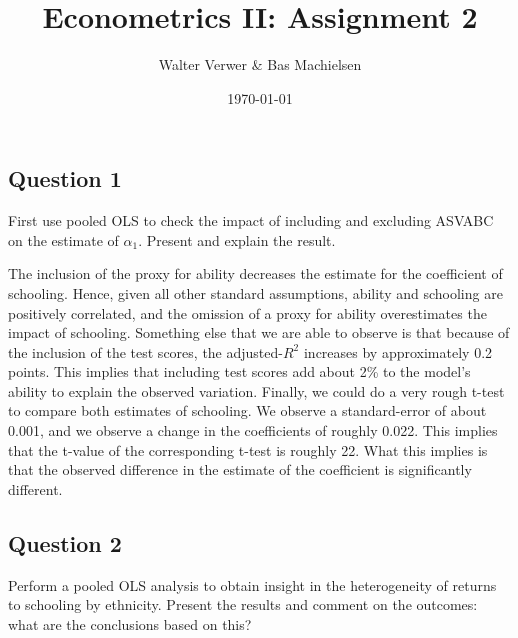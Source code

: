 \documentclass[
]{article}
\title{Econometrics II: Assignment 2}
\author{Walter Verwer \& Bas Machielsen}
\date{\today}
\begin{document}
\maketitle

\hypertarget{question-1}{%
\subsection{Question 1}\label{question-1}}

First use pooled OLS to check the impact of including and excluding
ASVABC on the estimate of \(\alpha_1\). Present and explain the result.



The inclusion of the proxy for ability decreases the estimate for the
coefficient of schooling. Hence, given all other standard assumptions,
ability and schooling are positively correlated, and the omission of a
proxy for ability overestimates the impact of schooling. Something else
that we are able to observe is that because of the inclusion of the test
scores, the adjusted-\(R^2\) increases by approximately 0.2 points. This
implies that including test scores add about 2\% to the model's ability
to explain the observed variation. Finally, we could do a very rough
t-test to compare both estimates of schooling. We observe a
standard-error of about 0.001, and we observe a change in the
coefficients of roughly 0.022. This implies that the t-value of the
corresponding t-test is roughly 22. What this implies is that the
observed difference in the estimate of the coefficient is significantly
different.

\clearpage

\hypertarget{question-2}{%
\subsection{Question 2}\label{question-2}}

Perform a pooled OLS analysis to obtain insight in the heterogeneity of
returns to schooling by ethnicity. Present the results and comment on
the outcomes: what are the conclusions based on this?


\end{document}
